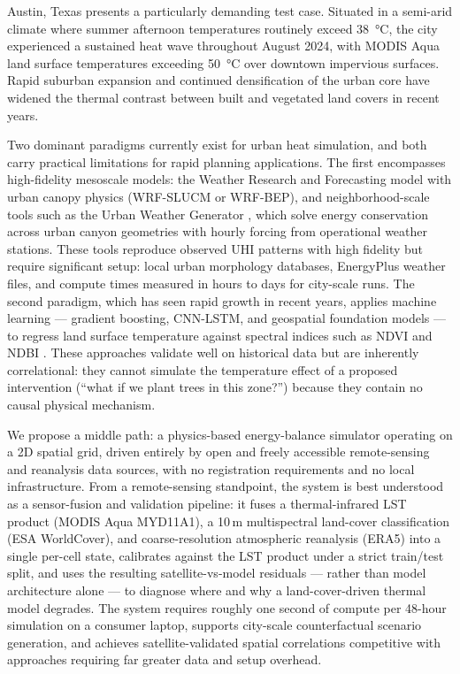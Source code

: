 \documentclass[12pt, letterpaper]{article}
\begin{document}
Austin, Texas presents a particularly demanding test case. Situated in a
semi-arid climate where summer afternoon temperatures routinely exceed
\SI{38}{\degreeCelsius}, the city experienced a sustained heat wave throughout
August 2024, with MODIS Aqua land surface temperatures exceeding
\SI{50}{\degreeCelsius} over downtown impervious surfaces. Rapid suburban
expansion and continued densification of the urban core have widened the
thermal contrast between built and vegetated land covers in recent years.

Two dominant paradigms currently exist for urban heat simulation, and both
carry practical limitations for rapid planning applications. The first
encompasses high-fidelity mesoscale models: the Weather Research and
Forecasting model with urban canopy physics (WRF-SLUCM or WRF-BEP), and
neighborhood-scale tools such as the Urban Weather Generator
\citep{bueno2013urban}, which solve energy conservation across urban canyon
geometries with hourly forcing from operational weather stations. These tools
reproduce observed UHI patterns with high fidelity but require significant
setup: local urban morphology databases, EnergyPlus weather files, and compute
times measured in hours to days for city-scale runs. The second paradigm,
which has seen rapid growth in recent years, applies machine learning —
gradient boosting, CNN-LSTM, and geospatial foundation models — to regress
land surface temperature against spectral indices such as NDVI and NDBI
\citep{lyu2022integrated}. These approaches validate well on historical data
but are inherently correlational: they cannot simulate the temperature effect of
a proposed intervention (``what if we plant trees in this zone?'') because
they contain no causal physical mechanism.

We propose a middle path: a physics-based energy-balance simulator operating
on a 2D spatial grid, driven entirely by open and freely accessible remote-sensing
and reanalysis data sources, with no registration requirements and no local
infrastructure. From a remote-sensing standpoint, the system is best
understood as a sensor-fusion and validation pipeline: it fuses a
thermal-infrared LST product (MODIS Aqua MYD11A1), a 10\,m multispectral
land-cover classification (ESA WorldCover), and coarse-resolution atmospheric
reanalysis (ERA5) into a single per-cell state, calibrates against the LST
product under a strict train/test split, and uses the resulting
satellite-vs-model residuals — rather than model architecture alone — to
diagnose where and why a land-cover-driven thermal model degrades. The
system requires roughly one second of compute per 48-hour simulation on a
consumer laptop, supports city-scale counterfactual scenario generation, and
achieves satellite-validated spatial correlations competitive with approaches
requiring far greater data and setup overhead.
\end{document}
